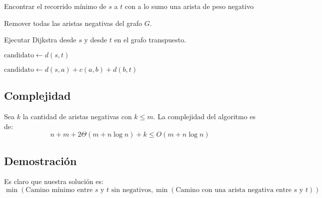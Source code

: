 \documentclass{article}
\begin{document}
\begin{algorithm}[H]
\caption{Encontrar el recorrido mínimo de \( s \) a \( t \) con a lo sumo una arista de peso negativo}
\begin{algorithmic}[1]
\STATE Remover todas las aristas negativas del grafo \( G \).

\vspace{0.5em}

\STATE Ejecutar Dijkstra desde \( s \) y desde \( t \) en el grafo transpuesto.

\vspace{0.5em}

\STATE $\text{candidato} \gets d(s, t)$ 

\vspace{0.5em}


    \vspace{0.5em}
    
    
        \vspace{0.5em}
        
        \STATE $\text{candidato} \gets d(s, a) + c(a, b) + d(b, t)$
        
        \vspace{0.5em}
        
    \ENDIF
\ENDFOR

\vspace{0.5em}

\RETURN {}

\end{algorithmic}
\end{algorithm}

\subsection*{Complejidad}

Sea \( k \) la cantidad de aristas negativas con \( k \leq m \). La complejidad del algoritmo es de: 
\[ n + m + 2\Theta(m + n \log n) + k \leq O(m + n \log n) \]

\subsection*{Demostración}

Es claro que nuestra solución es:
\[ \min(\text{Camino mínimo entre } s \text{ y } t \text{ sin negativos}, \min(\text{Camino con una arista negativa entre } s \text{ y } t)) \]
\end{document}
